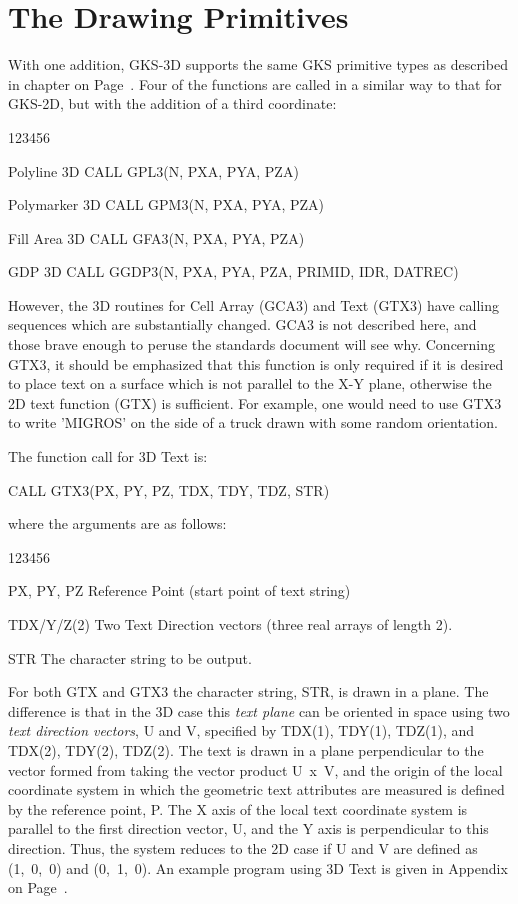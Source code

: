 \section{The Drawing Primitives}
 
With one addition, GKS-3D supports the same GKS primitive types as
described in chapter on Page~\pageref{sec:dprim}.
Four of the functions are called in a similar way to that for GKS-2D,
but with the addition of a third coordinate:
\begin{DLtt}{123456}
\item[Polyline 3D]CALL GPL3(N, PXA, PYA, PZA)
\item[Polymarker 3D]CALL GPM3(N, PXA, PYA, PZA)
\item[Fill Area 3D]CALL GFA3(N, PXA, PYA, PZA)
\item[GDP 3D]CALL GGDP3(N, PXA, PYA, PZA, PRIMID, IDR, DATREC)
\end{DLtt}
 
However, the 3D routines for Cell Array (GCA3) and Text (GTX3) have
calling sequences which are substantially changed.
GCA3 is not described here, and those brave enough to peruse
the standards document will see why. Concerning GTX3, it should be
emphasized that this function is only required if it is desired to place
text on a surface which is not parallel to the X-Y plane,
otherwise the 2D text function (GTX) is sufficient.
For example, one would need to use GTX3 to write 'MIGROS' on the
side of a truck drawn with some random orientation.
 
The function call for 3D Text is:
\begin{XMP}
CALL GTX3(PX, PY, PZ, TDX, TDY, TDZ, STR)
\end{XMP}
where the arguments are as follows:
\begin{DLtt}{123456}
\item[PX, PY, PZ]
Reference Point (start point of text string)
\item[TDX/Y/Z(2)]
Two Text Direction vectors (three real arrays of length 2).
\item[STR]
The character string to be output.
\end{DLtt}
For both GTX and GTX3 the character string, STR, is drawn in a plane.
The difference is that in the 3D case this {\it text plane} can be
oriented in space using two {\it text direction vectors}, U and V,
specified by TDX(1), TDY(1), TDZ(1), and TDX(2), TDY(2), TDZ(2).
The text is drawn in a plane perpendicular to the vector formed from
taking the vector product U~x~V,
and the origin of the local coordinate system in which the geometric
text attributes are measured is defined by the reference point, P.
The X axis of the local text coordinate system is parallel to the
first direction vector, U, and the Y axis is perpendicular
to this direction. Thus, the system reduces to the 2D case if
U and V are defined as (1,~0,~0) and (0,~1,~0).
An example program using 3D Text is given in Appendix on Page~\pageref{sec:ex3dv}.
 
